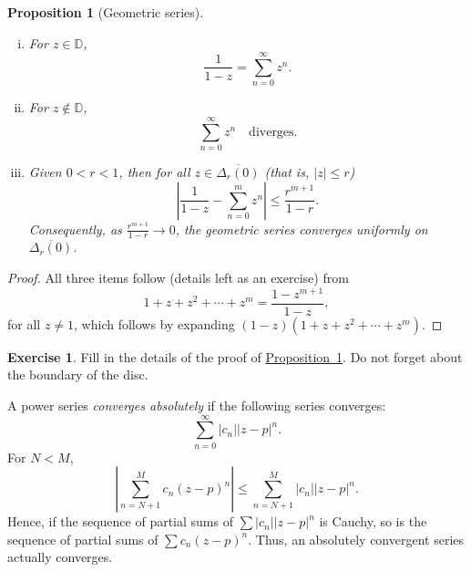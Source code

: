 \documentclass[12pt,openany]{book}
\newcommand{\sabs}[1]{\lvert {#1} \rvert}
\newcommand{\abs}[1]{\left\lvert {#1} \right\rvert}
\newcommand{\D}{{\mathbb{D}}}
\theoremstyle{plain}
\newtheorem{prop}[thm]{Proposition}
\theoremstyle{remark}
\theoremstyle{definition}
\newenvironment{exbox}{%
    \def\FrameCommand{\vrule width 1pt \relax\hspace{10pt}}%
    \MakeFramed{\advance\hsize-\width\FrameRestore}%
}{%
    \endMakeFramed
}
\theoremstyle{exercise}
\newtheorem{exercise}{Exercise}[section]
\theoremstyle{example}
\newcommand{\propref}[1]{\hyperref[#1]{Proposition~\ref*{#1}}}
\begin{document}
\begin{prop}[Geometric series]\label{prop:geomseries}
\leavevmode
\begin{enumerate}[(i)]
\item For $z \in \D$,
\begin{equation*}
\frac{1}{1-z} = \sum_{n=0}^\infty z^n .
\end{equation*}
\item For $z \notin \D$,
\begin{equation*}
\sum_{n=0}^\infty z^n \quad \text{diverges.}
\end{equation*}
\item
Given $0 < r < 1$, then for all $z \in \overline{\Delta_r(0)}$
(that is, $\sabs{z} \leq r$)
\begin{equation*}
\abs{\frac{1}{1-z} - \sum_{n=0}^m z^n}
\leq \frac{r^{m+1}}{1-r} .
\end{equation*}
Consequently,
as $\frac{r^{m+1}}{1-r} \to 0$,
the geometric series converges uniformly
on $\overline{\Delta_r(0)}$.
\end{enumerate}
\end{prop}

\begin{proof}
All three items follow (details left as an exercise) from
\begin{equation*}
1+z+z^2+\cdots+z^m = \frac{1-z^{m+1}}{1-z} ,
\end{equation*}
for all $z \neq 1$, which follows by expanding 
$(1-z)(1+z+z^2+\cdots+z^m)$.
\end{proof}

\begin{exbox}
\begin{exercise}
Fill in the details of the proof of \propref{prop:geomseries}.  Do not forget
about the boundary of the disc.
\end{exercise}
\end{exbox}

A power series \emph{converges absolutely}%
%
if the following series converges:
\begin{equation*}
\sum_{n=0}^\infty \sabs{c_n} \sabs{z-p}^n .
\end{equation*}
For $N < M$,
\begin{equation*}
\abs{\sum_{n=N+1}^M c_n {(z-p)}^n}
\leq
\sum_{n=N+1}^M \sabs{c_n} \sabs{z-p}^n.
\end{equation*}
Hence, if the sequence of partial sums of 
$\sum \sabs{c_n} \sabs{z-p}^n$ is Cauchy, so is the sequence
of partial sums of $\sum c_n {(z-p)}^n$.  Thus,
an absolutely convergent series
actually converges.
\end{document}
